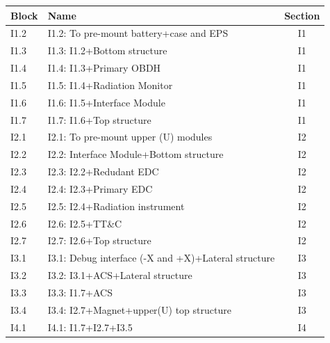 \begin{table}[!htb]
\centering
\begin{tabular}{llc}
    \toprule[1.5pt]
 	\textbf{Block} & \textbf{Name} & \textbf{Section} \\
 	\midrule
    I1.2     & I1.2: To pre-mount battery+case and EPS                           & {I1} \\
	I1.3     & I1.3: I1.2+Bottom structure                                       & {I1} \\
    I1.4     & I1.4: I1.3+Primary OBDH                                           & {I1} \\
    I1.5     & I1.5: I1.4+Radiation Monitor                                      & {I1} \\
    I1.6     & I1.6: I1.5+Interface Module                                       & {I1} \\
    I1.7     & I1.7: I1.6+Top structure                                          & {I1} \\
    I2.1     & I2.1: To pre-mount upper (U) modules                              & {I2} \\
    I2.2     & I2.2: Interface Module+Bottom structure                           & {I2} \\
    I2.3     & I2.3: I2.2+Redudant EDC                                           & {I2} \\
    I2.4     & I2.4: I2.3+Primary EDC                                            & {I2} \\
    I2.5     & I2.5: I2.4+Radiation instrument                                              & {I2} \\
    I2.6     & I2.6: I2.5+TT\&C                                                  & {I2} \\
    I2.7     & I2.7: I2.6+Top structure                                          & {I2} \\
    I3.1     & I3.1: Debug interface (-X and +X)+Lateral structure               & {I3} \\
    I3.2     & I3.2: I3.1+\ac{ACS}+Lateral structure                                 & {I3} \\
    I3.3     & I3.3: I1.7+\ac{ACS}                                                   & {I3} \\
    I3.4     & I3.4: I2.7+Magnet+upper(U) top structure                          & {I3} \\
    I4.1     & I4.1: I1.7+I2.7+I3.5                                              & {I4} \\

\end{tabular}
\end{table}
